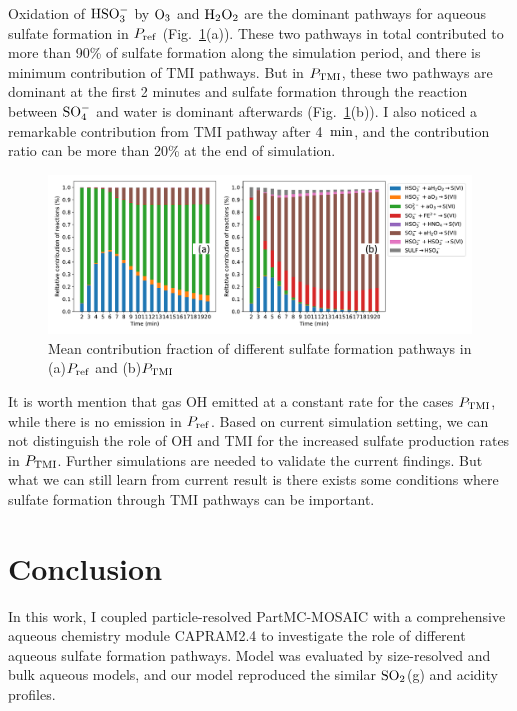 \documentclass[edeposit,fullpage]{uiucthesis2009}
\makeatletter
\DeclareRobustCommand*\unit[1]
 {\ensuremath{%
   {\thinmuskip3mu\relax
    \def\mu{\text{\textmu}}\def~{\,}%
    \ifx\f@series\testbx\mathbf{#1}\else\mathrm{#1}\fi}}}
\makeatother
\begin{document}
Oxidation of $\rm HSO_3^-$ by $\rm O_3$ and $\rm H_2O_2$ are the dominant pathways for aqueous sulfate formation in $P_{\rm ref}$ (Fig.~\ref{chap2:iron-contri}(a)). These two pathways in total contributed to more than 90\% of sulfate formation along the simulation period, and there is minimum contribution of TMI pathways. But in $P_{\rm TMI}$, these two pathways are dominant at the first 2 minutes and sulfate formation through the reaction between $\rm SO_4^-$ and water is dominant afterwards (Fig.~\ref{chap2:iron-contri}(b)). I also noticed a remarkable contribution from TMI pathway after 4~\unit{min}, and the contribution ratio can be more than 20\% at the end of simulation. 

\begin{figure}[ht]
    \centering \includegraphics[scale=0.6]{chap2_figs/chap2-TMI_contri_factors.pdf}
    \caption{Mean contribution fraction of different sulfate formation pathways in (a)$P_{\rm ref}$ and (b)$P_{\rm TMI}$}
    \label{chap2:iron-contri}
\end{figure}

It is worth mention that gas OH emitted at a constant rate for the cases $P_{\rm TMI}$, while there is no emission in $P_{\rm ref}$. Based on current simulation setting, we can not distinguish the role of OH and TMI for the increased sulfate production rates in $P_{\rm TMI}$. Further simulations are needed to validate the current findings. But what we can still learn from current result is there exists some conditions where sulfate formation through TMI pathways can be important. 

\section{Conclusion}
\label{chap2.6}
In this work, I coupled particle-resolved PartMC-MOSAIC with a comprehensive aqueous chemistry 
module CAPRAM2.4 to investigate the role of different aqueous sulfate formation pathways. 
Model was evaluated by size-resolved and bulk aqueous models, and our model reproduced the similar $\rm SO_2$(g) and 
acidity profiles. 
\end{document}

